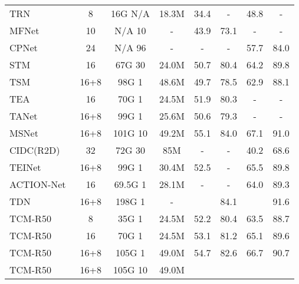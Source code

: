 \documentclass[journal]{IEEEtran}
\begin{document}
\begin{table*}
\begin{tabular}{l|c|c|c|c|c|c|c}
TRN~\cite{zhou2018temporal}  & 8     & 16G  N/A          & 18.3M & 34.4           & -              & 48.8           & -              \\
MFNet~\cite{lee2018motion}   & 10    & N/A  10           & -     & 43.9           & 73.1           & -              & -              \\
CPNet~\cite{liu2019learning}   & 24    & N/A  96           & -     & -              & -              & 57.7           & 84.0           \\
STM~\cite{jiang2019stm}       & 16    & 67G  30  & 24.0M & 50.7           & 80.4           & 64.2           & 89.8 \\
TSM~\cite{lin2019tsm}       & 16+8  & 98G  1   & 48.6M & 49.7           & 78.5           & 62.9           & 88.1           \\
TEA~\cite{li2020tea}     & 16       &  70G   1                        & 24.5M      & 51.9       &  80.3        & -          &  -              \\
TANet~\cite{liu2020tam} &16+8  & 99G  1   & 25.6M & 50.6           & 79.3           & -           & -           \\
MSNet~\cite{kwon2020motionsqueeze}      & 16+8  & 101G  10 & 49.2M & 55.1           & 84.0           & 67.1           & 91.0           \\
CIDC(R2D) ~\cite{li2020directional}  & 32    & 72G  30   & 85M     & -           & -           & 40.2              & 68.6              \\
TEINet~\cite{liu2020teinet} &16+8  & 99G  1   & 30.4M & 52.5           & -           & 65.5           & 89.8           \\
ACTION-Net~\cite{wang2021action} & 16  & 69.5G  1            & 28.1M       & -        & - & 64.0   & 89.3 \\
TDN~\cite{wang2021tdn} & 16+8  & 198G  1 & - &            & 84.1           &            & 91.6           \\
\hline
TCM-R50          & 8      &     35G  1                 &   24.5M    & 52.2      & 80.4        & 63.5           & 88.7                \\
TCM-R50          & 16     &     70G  1          &   24.5M    & 53.1                & 81.2               &   65.1            & 89.6               \\
TCM-R50     & 16+8     &    105G  1          &   49.0M    & 54.7                & 82.6                & 66.7       &  90.7              \\
TCM-R50     & 16+8     &    105G  10          &   49.0M    &        &      &      &  \\ \hline
\end{tabular}
\end{table*}
\end{document}
